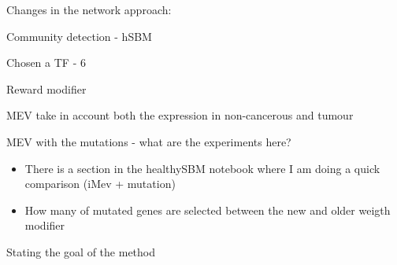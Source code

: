 \newpage

Changes in the network approach:
\begin{todolist}
    \item Community detection - hSBM
    \item Chosen a TF - 6
    \item [\done] Reward modifier
    \item [\done] MEV take in account both the expression in non-cancerous and tumour
    \item MEV with the mutations - what are the experiments here?
    \begin{itemize}
        \item There is a section in the healthySBM notebook where I am doing a quick comparison (iMev + mutation)
        \item How many of mutated genes are selected between the new and older weigth modifier
    \end{itemize}
    \item Stating the goal of the method
\end{todolist}

